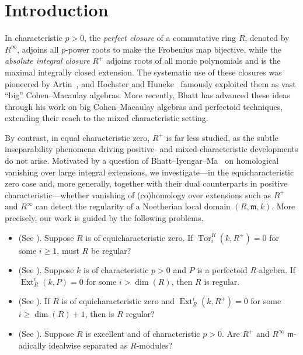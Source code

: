 \documentclass[12pt,reqno]{amsart}
\theoremstyle{definition}
\theoremstyle{remark}
\theoremstyle{cited}
\theoremstyle{remark}
\theoremstyle{citeddef}
\DeclareMathOperator{\Ext}{Ext}
\DeclareMathOperator{\Tor}{Tor}
\newcommand{\fm}{\mathfrak{m}}
\begin{document}
	\section{Introduction}
	In characteristic $p>0$, the \emph{perfect closure} of a commutative ring $R$, denoted by $R^\infty$, adjoins all $p$-power roots to make the Frobenius map bijective, while the \emph{absolute integral closure} $R^+$ adjoins roots of all monic polynomials and is the maximal integrally closed extension. The systematic use of these closures was pioneered by Artin~\cite{Art}, and Hochster and Huneke~\cite{HH} famously exploited them as vast ``big'' Cohen--Macaulay algebras. More recently, Bhatt \cite{bat} has advanced these ideas through his work on big Cohen--Macaulay algebras and perfectoid techniques, extending their reach to the mixed characteristic setting.
	
	By contrast, in equal characteristic zero, $R^+$ is far less studied,  as the subtle inseparability phenomena driving positive- and mixed-characteristic developments do not arise. Motivated by a question of Bhatt--Iyengar--Ma~\cite{bhatt2019Regular} on homological vanishing over large integral extensions, we investigate---in the equicharacteristic zero case and, more generally, together with their dual counterparts in positive characteristic---whether vanishing of (co)homology over extensions such as $R^+$ and $R^\infty$ can detect the regularity of a Noetherian local domain $(R,\mathfrak m,k)$. More precisely, our work is guided by the following problems.
	\begin{itemize}
		\item[$(Q_1)$] \label{question:BIMquestion}  (See \cite[End of \S4, Question]{bhatt2019Regular}). Suppose \(R\) is of  equicharacteristic zero. If
		\(
		\Tor_i^R(k,R^+)=0
		\)
		for some \(i\ge 1\), must \(R\) be regular?
		
		\item[(C)] (See \cite{Elham}). Suppose \(k\) is  of characteristic \(p>0\) and $P$ is a perfectoid $R$-algebra. If
		\(
		\Ext_R^i(k,P)=0
		\)
		for some \(i>\dim(R)\), then \(R\) is regular.
		\item[$(Q_2)$] (See \cite[Introduction]{Elham}). If \(R\) is   of equicharacteristic zero and \(\Ext_R^i(k,R^{+}) = 0\) for some \(i \geq \dim(R)+1\), then is \(R\) 
		regular?
		\item[$(Q_3)$] (See \cite[Section 3]{Shravan}). Suppose $R$ 
		is excellent and of characteristic $p>0$. Are
		$R^+$ and $R^\infty$ $\fm$-adically idealwise separated as $R$-modules?
	\end{itemize}
	
\end{document}
